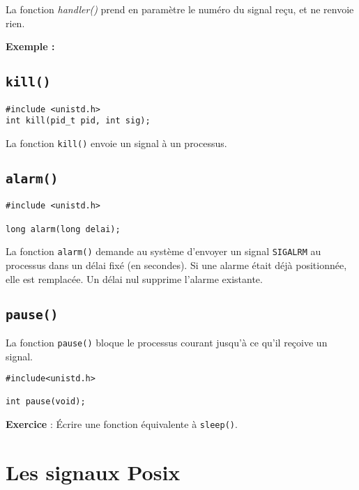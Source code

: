 La fonction \emph{handler()} prend en paramètre le numéro
du signal reçu, et ne renvoie rien. 


\textbf{Exemple : }

\source



\subsection{\texttt{kill()} }


\extrait
\begin{lstlisting}
#include <unistd.h>
int kill(pid_t pid, int sig);
\end{lstlisting}


La fonction \texttt{kill()} envoie un signal à un processus.

\subsection{\texttt{alarm()} }




\extrait
\begin{lstlisting}
#include <unistd.h>

long alarm(long delai);
\end{lstlisting}


La fonction \texttt{alarm()} demande au système d'envoyer un signal
\texttt{SIGALRM} au processus dans un délai fixé (en secondes). Si 
une alarme était déjà positionnée, elle est remplacée. Un délai
nul supprime l'alarme existante.


\subsection{\texttt{pause()} }


La fonction \texttt{pause()} bloque le processus courant jusqu'à ce qu'il
reçoive un signal.


\extrait
\begin{lstlisting}
#include<unistd.h>

int pause(void);
\end{lstlisting}


\textbf{Exercice} : Écrire une fonction équivalente à \texttt{sleep()}. 


\section{Les signaux Posix}

